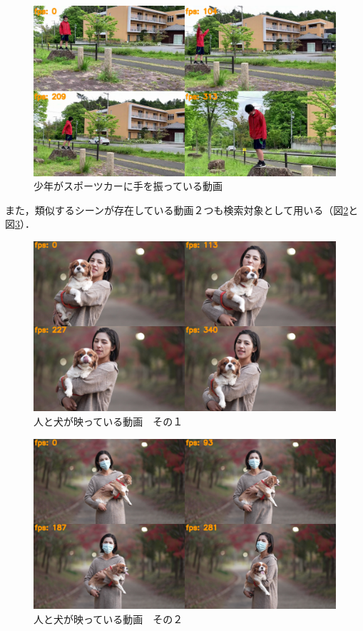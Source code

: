 \documentclass[a4j,12pt,dvipdfmx]{jreport}
\begin{document}
\begin{figure}[H]
  \centering
  \includegraphics[width=13cm]{image/6_result.jpg}
  \caption{少年がスポーツカーに手を振っている動画}
  \label{fig:movie6}
\end{figure}

また，類似するシーンが存在している動画２つも検索対象として用いる（図\ref{fig:movie7}と図\ref{fig:movie8}）．
\begin{figure}[H]
  \centering
  \includegraphics[width=13cm]{image/7_result.jpg}
  \caption{人と犬が映っている動画　その１}
  \label{fig:movie7}
\end{figure}

\begin{figure}[H]
  \centering
  \includegraphics[width=13cm]{image/8_result.jpg}
  \caption{人と犬が映っている動画　その２}
  \label{fig:movie8}
\end{figure}
\end{document}
